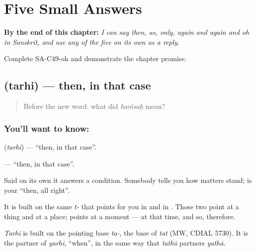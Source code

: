 
\chapter{Five Small Answers}
\label{ch:sa-small-answers}

\begin{chapteropening}
\textbf{By the end of this chapter:} \emph{I can say then, as, only, again and again and oh in Sanskrit, and use any of the five on its own as a reply.}

Complete SA-C49-oh and demonstrate the chapter promise.
\end{chapteropening}

\section[\texorpdfstring{\sk{तर्हि} (tarhi)}{तर्हि (tarhi)}]{ (tarhi) — then, in that case}

\label{lesson:SA-C49-then}



\begin{quote}
Before the new word: what did \emph{haṁsaḥ} mean?
\end{quote}

\subsection*{You'll want to know: }
\textbf{} (\emph{tarhi}) — \textquotedblleft{}then, in that case\textquotedblright{}.

\textbf{} — \textquotedblleft{}then, in that case\textquotedblright{}.

Said on its own it answers a condition. Somebody tells you how matters stand; \textbf{} is your \textquotedblleft{}then, all right\textquotedblright{}.

It is built on the same \emph{t-} that points for you in  and in . Those two point at a thing and at a place; \textbf{} points at a moment — at that time, and so, therefore.

\begin{cousinweb}
\emph{Tarhi} is built on the pointing base \emph{ta-}, the base of \emph{tat} (MW, CDIAL 5730). It is the partner of \emph{yarhi}, \textquotedblleft{}when\textquotedblright{}, in the same way that \emph{tathā} partners \emph{yathā}.
\end{cousinweb}

